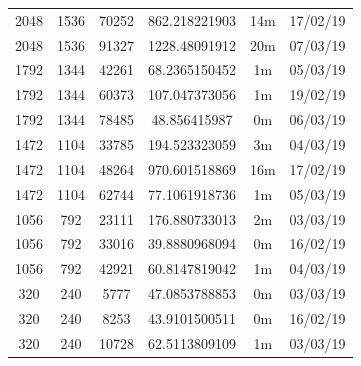 \documentclass[11pt,a4paper]{report}
\begin{document}
\begin{itemize}
\begin{center}
\begin{tabular}{ c c c | c c c }
  2048 & 1536 & 70252 & 862.218221903 & 14m & 17/02/19 \\
  2048 & 1536 & 91327 & 1228.48091912 & 20m & 07/03/19 \\
  1792 & 1344 & 42261 & 68.2365150452 & 1m & 05/03/19 \\
  1792 & 1344 & 60373 & 107.047373056 & 1m & 19/02/19 \\
  1792 & 1344 & 78485 & 48.856415987 & 0m & 06/03/19 \\
  1472 & 1104 & 33785 & 194.523323059 & 3m & 04/03/19 \\
  1472 & 1104 & 48264 & 970.601518869 & 16m & 17/02/19 \\
  1472 & 1104 & 62744 & 77.1061918736 & 1m & 05/03/19 \\
  1056 & 792 & 23111 & 176.880733013 & 2m & 03/03/19 \\
  1056 & 792 & 33016 & 39.8880968094 & 0m & 16/02/19 \\
  1056 & 792 & 42921 & 60.8147819042 & 1m & 04/03/19 \\
  320 & 240 & 5777 & 47.0853788853 & 0m & 03/03/19 \\
  320 & 240 & 8253 & 43.9101500511 & 0m & 16/02/19 \\
  320 & 240 & 10728 & 62.5113809109 & 1m & 03/03/19 \\
  \end{tabular}
  \end{center}


\end{itemize}
\end{document}
